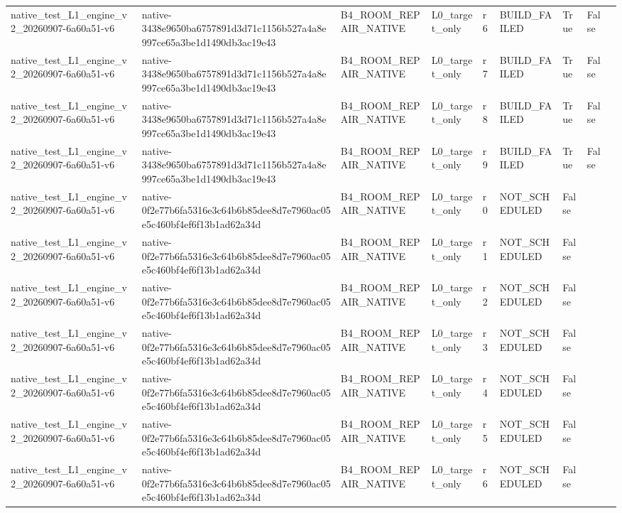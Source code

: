 \begin{tabular}{lllllllll}
native\_test\_L1\_engine\_v2\_20260907-6a60a51-v6 & native-3438e9650ba6757891d3d71c1156b527a4a8e997ce65a3be1d1490db3ac19e43 & B4\_ROOM\_REPAIR\_NATIVE & L0\_target\_only & r6 & BUILD\_FAILED & True & False &  \\
native\_test\_L1\_engine\_v2\_20260907-6a60a51-v6 & native-3438e9650ba6757891d3d71c1156b527a4a8e997ce65a3be1d1490db3ac19e43 & B4\_ROOM\_REPAIR\_NATIVE & L0\_target\_only & r7 & BUILD\_FAILED & True & False &  \\
native\_test\_L1\_engine\_v2\_20260907-6a60a51-v6 & native-3438e9650ba6757891d3d71c1156b527a4a8e997ce65a3be1d1490db3ac19e43 & B4\_ROOM\_REPAIR\_NATIVE & L0\_target\_only & r8 & BUILD\_FAILED & True & False &  \\
native\_test\_L1\_engine\_v2\_20260907-6a60a51-v6 & native-3438e9650ba6757891d3d71c1156b527a4a8e997ce65a3be1d1490db3ac19e43 & B4\_ROOM\_REPAIR\_NATIVE & L0\_target\_only & r9 & BUILD\_FAILED & True & False &  \\
native\_test\_L1\_engine\_v2\_20260907-6a60a51-v6 & native-0f2e77b6fa5316e3c64b6b85dee8d7e7960ac05e5c460bf4ef6f13b1ad62a34d & B4\_ROOM\_REPAIR\_NATIVE & L0\_target\_only & r0 & NOT\_SCHEDULED & False &  &  \\
native\_test\_L1\_engine\_v2\_20260907-6a60a51-v6 & native-0f2e77b6fa5316e3c64b6b85dee8d7e7960ac05e5c460bf4ef6f13b1ad62a34d & B4\_ROOM\_REPAIR\_NATIVE & L0\_target\_only & r1 & NOT\_SCHEDULED & False &  &  \\
native\_test\_L1\_engine\_v2\_20260907-6a60a51-v6 & native-0f2e77b6fa5316e3c64b6b85dee8d7e7960ac05e5c460bf4ef6f13b1ad62a34d & B4\_ROOM\_REPAIR\_NATIVE & L0\_target\_only & r2 & NOT\_SCHEDULED & False &  &  \\
native\_test\_L1\_engine\_v2\_20260907-6a60a51-v6 & native-0f2e77b6fa5316e3c64b6b85dee8d7e7960ac05e5c460bf4ef6f13b1ad62a34d & B4\_ROOM\_REPAIR\_NATIVE & L0\_target\_only & r3 & NOT\_SCHEDULED & False &  &  \\
native\_test\_L1\_engine\_v2\_20260907-6a60a51-v6 & native-0f2e77b6fa5316e3c64b6b85dee8d7e7960ac05e5c460bf4ef6f13b1ad62a34d & B4\_ROOM\_REPAIR\_NATIVE & L0\_target\_only & r4 & NOT\_SCHEDULED & False &  &  \\
native\_test\_L1\_engine\_v2\_20260907-6a60a51-v6 & native-0f2e77b6fa5316e3c64b6b85dee8d7e7960ac05e5c460bf4ef6f13b1ad62a34d & B4\_ROOM\_REPAIR\_NATIVE & L0\_target\_only & r5 & NOT\_SCHEDULED & False &  &  \\
native\_test\_L1\_engine\_v2\_20260907-6a60a51-v6 & native-0f2e77b6fa5316e3c64b6b85dee8d7e7960ac05e5c460bf4ef6f13b1ad62a34d & B4\_ROOM\_REPAIR\_NATIVE & L0\_target\_only & r6 & NOT\_SCHEDULED & False &  &  \\

\end{tabular}
